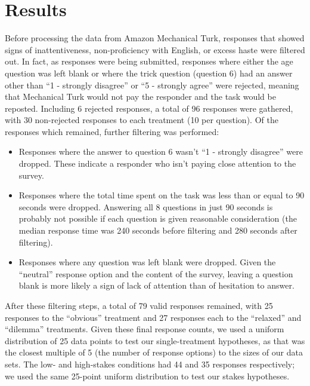 \section{Results}

Before processing the data from Amazon Mechanical Turk, responses that showed signs of inattentiveness, non-proficiency with English, or excess haste were filtered out.
%
In fact, as responses were being submitted, responses where either the age question was left blank or where the trick question (question 6) had an answer other than ``1 - strongly disagree'' or ``5 - strongly agree'' were rejected, meaning that Mechanical Turk would not pay the responder and the task would be reposted.
%
Including 6 rejected responses, a total of 96 responses were gathered, with 30 non-rejected responses to each treatment (10 per question).
%
Of the responses which remained, further filtering was performed:
%
\begin{itemize}
  \item Responses where the answer to question 6 wasn't ``1 - strongly disagree'' were dropped. These indicate a responder who isn't paying close attention to the survey.
  \item Responses where the total time spent on the task was less than or equal to 90 seconds were dropped. Answering all 8 questions in just 90 seconds is probably not possible if each question is given reasonable consideration (the median response time was 240 seconds before filtering and 280 seconds after filtering).
  \item Responses where any question was left blank were dropped. Given the ``neutral'' response option and the content of the survey, leaving a question blank is more likely a sign of lack of attention than of hesitation to answer.
\end{itemize}
%
After these filtering steps, a total of 79 valid responses remained, with 25 responses to the ``obvious'' treatment and 27 responses each to the ``relaxed'' and ``dilemma'' treatments.
%
Given these final response counts, we used a uniform distribution of 25 data points to test our single-treatment hypotheses, as that was the closest multiple of 5 (the number of response options) to the sizes of our data sets.
%
The low- and high-stakes conditions had 44 and 35 responses respectively; we used the same 25-point uniform distribution to test our stakes hypotheses.


